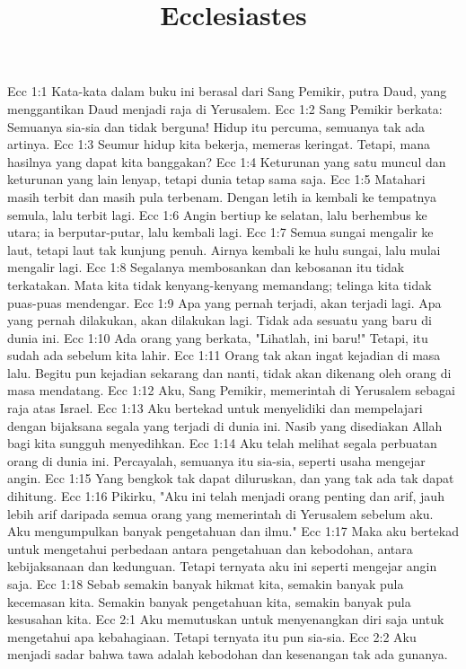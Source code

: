 

\title{Ecclesiastes}

Ecc 1:1  Kata-kata dalam buku ini berasal dari Sang Pemikir, putra Daud, yang menggantikan Daud menjadi raja di Yerusalem.
Ecc 1:2  Sang Pemikir berkata: Semuanya sia-sia dan tidak berguna! Hidup itu percuma, semuanya tak ada artinya.
Ecc 1:3  Seumur hidup kita bekerja, memeras keringat. Tetapi, mana hasilnya yang dapat kita banggakan?
Ecc 1:4  Keturunan yang satu muncul dan keturunan yang lain lenyap, tetapi dunia tetap sama saja.
Ecc 1:5  Matahari masih terbit dan masih pula terbenam. Dengan letih ia kembali ke tempatnya semula, lalu terbit lagi.
Ecc 1:6  Angin bertiup ke selatan, lalu berhembus ke utara; ia berputar-putar, lalu kembali lagi.
Ecc 1:7  Semua sungai mengalir ke laut, tetapi laut tak kunjung penuh. Airnya kembali ke hulu sungai, lalu mulai mengalir lagi.
Ecc 1:8  Segalanya membosankan dan kebosanan itu tidak terkatakan. Mata kita tidak kenyang-kenyang memandang; telinga kita tidak puas-puas mendengar.
Ecc 1:9  Apa yang pernah terjadi, akan terjadi lagi. Apa yang pernah dilakukan, akan dilakukan lagi. Tidak ada sesuatu yang baru di dunia ini.
Ecc 1:10  Ada orang yang berkata, "Lihatlah, ini baru!" Tetapi, itu sudah ada sebelum kita lahir.
Ecc 1:11  Orang tak akan ingat kejadian di masa lalu. Begitu pun kejadian sekarang dan nanti, tidak akan dikenang oleh orang di masa mendatang.
Ecc 1:12  Aku, Sang Pemikir, memerintah di Yerusalem sebagai raja atas Israel.
Ecc 1:13  Aku bertekad untuk menyelidiki dan mempelajari dengan bijaksana segala yang terjadi di dunia ini. Nasib yang disediakan Allah bagi kita sungguh menyedihkan.
Ecc 1:14  Aku telah melihat segala perbuatan orang di dunia ini. Percayalah, semuanya itu sia-sia, seperti usaha mengejar angin.
Ecc 1:15  Yang bengkok tak dapat diluruskan, dan yang tak ada tak dapat dihitung.
Ecc 1:16  Pikirku, "Aku ini telah menjadi orang penting dan arif, jauh lebih arif daripada semua orang yang memerintah di Yerusalem sebelum aku. Aku mengumpulkan banyak pengetahuan dan ilmu."
Ecc 1:17  Maka aku bertekad untuk mengetahui perbedaan antara pengetahuan dan kebodohan, antara kebijaksanaan dan kedunguan. Tetapi ternyata aku ini seperti mengejar angin saja.
Ecc 1:18  Sebab semakin banyak hikmat kita, semakin banyak pula kecemasan kita. Semakin banyak pengetahuan kita, semakin banyak pula kesusahan kita.
Ecc 2:1  Aku memutuskan untuk menyenangkan diri saja untuk mengetahui apa kebahagiaan. Tetapi ternyata itu pun sia-sia.
Ecc 2:2  Aku menjadi sadar bahwa tawa adalah kebodohan dan kesenangan tak ada gunanya.

